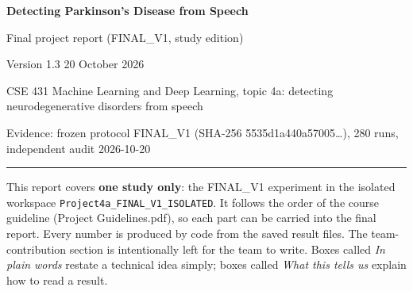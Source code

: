 \documentclass[11pt,a4paper]{article}
\begin{document}
\begin{center}{\LARGE\bfseries Detecting Parkinson's Disease from Speech\par}\vspace{6pt}
{\Large Final project report (FINAL\_V1, study edition)\par}\vspace{4pt}
{\large Version 1.3 \textperiodcentered{} 20 October 2026\par}\vspace{6pt}
{\normalsize CSE 431 Machine Learning and Deep Learning, topic 4a: detecting neurodegenerative disorders from speech\par}\vspace{3pt}
{\small Evidence: frozen protocol FINAL\_V1 (SHA-256 5535d1a440a57005\ldots), 280 runs, independent audit \textperiodcentered{} 2026-10-20\par}\end{center}
\vspace{4pt}\hrule\vspace{6pt}
\tableofcontents
\newpage
\begin{tcolorbox}[colback=gray!5,colframe=gray!60!black,boxrule=0.5pt,arc=2pt,left=5pt,right=5pt,top=3pt,bottom=3pt,title={\small\bfseries Note}]\small This report covers \textbf{one study only}: the FINAL\_V1 experiment in the isolated workspace \texttt{Project4a\_\allowbreak{}FINAL\_\allowbreak{}V1\_\allowbreak{}ISOLATED}. It follows the order of the course guideline (Project Guidelines.pdf), so each part can be carried into the final report. Every number is produced by code from the saved result files. The team-contribution section is intentionally left for the team to write. Boxes called \emph{In plain words} restate a technical idea simply; boxes called \emph{What this tells us} explain how to read a result.\end{tcolorbox}
\end{document}
